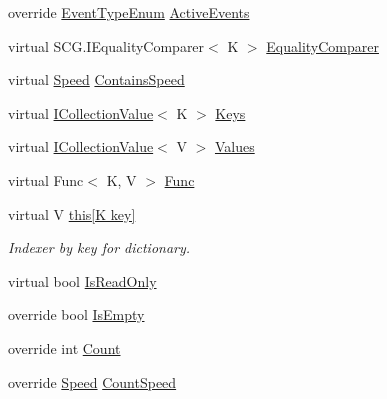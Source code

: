 \begin{DoxyCompactItemize}
\item 
override \hyperlink{namespace_c5_a9143bfd561fffa025d21561674758008}{Event\+Type\+Enum} \hyperlink{class_c5_1_1_dictionary_base_a4ce610755137141287e684b92cdf534c}{Active\+Events}
\item 
virtual S\+C\+G.\+I\+Equality\+Comparer$<$ K $>$ \hyperlink{class_c5_1_1_dictionary_base_a63cd9471d097f20096d8e3bb22fffa33}{Equality\+Comparer}
\item 
virtual \hyperlink{namespace_c5_a615ba88dcdaa8d5a3c5f833a73d7fad6}{Speed} \hyperlink{class_c5_1_1_dictionary_base_ae3c0eb5e4b8a6735f4012b9a370cc769}{Contains\+Speed}
\item 
virtual \hyperlink{interface_c5_1_1_i_collection_value}{I\+Collection\+Value}$<$ K $>$ \hyperlink{class_c5_1_1_dictionary_base_a42cbd2cf8d32a18b4ca17b82cf026ea5}{Keys}
\item 
virtual \hyperlink{interface_c5_1_1_i_collection_value}{I\+Collection\+Value}$<$ V $>$ \hyperlink{class_c5_1_1_dictionary_base_adf392009742ab67a355c66cf423f5fe6}{Values}
\item 
virtual Func$<$ K, V $>$ \hyperlink{class_c5_1_1_dictionary_base_afd227ddeb666195929f2b441b0c07bb7}{Func}
\item 
virtual V \hyperlink{class_c5_1_1_dictionary_base_aca2fd266c08a8668a6f1e5b85aa43d6b}{this\mbox{[}\+K key\mbox{]}}
\begin{DoxyCompactList}\small\item\em Indexer by key for dictionary. \end{DoxyCompactList}\item 
virtual bool \hyperlink{class_c5_1_1_dictionary_base_a12af62ed33fb01b0f103be5d4351e192}{Is\+Read\+Only}
\item 
override bool \hyperlink{class_c5_1_1_dictionary_base_a6749a3f0ec6472fab5365732c66e826b}{Is\+Empty}
\item 
override int \hyperlink{class_c5_1_1_dictionary_base_adcf48a45f296db6a12893ad7b13abb02}{Count}
\item 
override \hyperlink{namespace_c5_a615ba88dcdaa8d5a3c5f833a73d7fad6}{Speed} \hyperlink{class_c5_1_1_dictionary_base_a6101979f24376d2e8640394e66264210}{Count\+Speed}
\end{DoxyCompactItemize}


